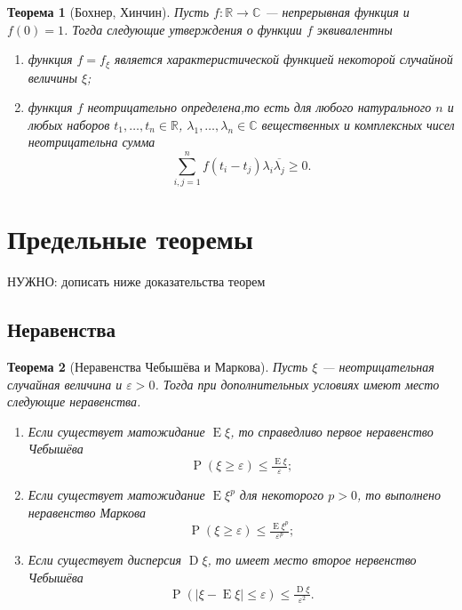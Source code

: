\documentclass[12pt]{article}
\newtheorem{theorem}{Теорема}
\numberwithin{theorem}{section}
\theoremstyle{definition}
\newcommand{\CC}{\mathbb{C}}
\newcommand{\RR}{\mathbb{R}}
\newcommand{\prob}{\operatorname{P}}
\newcommand{\expect}{\operatorname{E}}
\newcommand{\disp}{\operatorname{D}}
\newcommand{\TODO}[1]{\textcolor{todocolor}{НУЖНО: #1}}
\begin{document}
	\begin{theorem}[Бохнер, Хинчин]
		Пусть $ f \colon \RR \to \CC $ --- непрерывная функция и $ f(0) = 1 $.
		Тогда следующие утверждения о функции $ f $ эквивалентны
		\begin{enumerate}
			\item функция $ f = f_\xi $ является характеристической функцией некоторой случайной величины $ \xi $;
			\item функция $ f $ неотрицательно определена,то есть для любого натурального $ n $
			и любых наборов $ t_1, \ldots, t_n \in \RR $, $ \lambda_1, \ldots, \lambda_n \in \CC $
			вещественных и комплексных чисел неотрицательна
			сумма 
			$$ \sum\limits_{i,j = 1}^{n} f(t_i - t_j)\lambda_i\overline{\lambda_j} \geqslant 0. $$
		\end{enumerate}
	\end{theorem}
	
	\section{Предельные теоремы}
	
	\TODO{дописать ниже доказательства теорем}
	
	\subsection{Неравенства}
	
	\begin{theorem}[Неравенства Чебышёва и Маркова] \label{inequalities}
		Пусть $ \xi $ --- неотрицательная случайная величина и $ \varepsilon > 0 $.
		Тогда при дополнительных условиях имеют место следующие неравенства.
		\begin{enumerate}
			\item Если существует матожидание $ \expect\xi $, 
			то справедливо первое неравенство Чебышёва 
			$$ \prob(\xi \geqslant \varepsilon) \leqslant \tfrac{\expect\xi}{\varepsilon}; $$
			\label{inequalities | Chebyshev 1}
			\item Если существует матожидание $ \expect\xi^p $ для некоторого $ p > 0 $,
			то выполнено неравенство Маркова
			$$ \prob(\xi \geqslant \varepsilon) \leqslant \tfrac{\expect\xi^p}{\varepsilon^p}; $$
			\label{inequalities | Markov}
			\item Если существует дисперсия $ \disp\xi $, то имеет место второе нервенство Чебышёва
			$$ \prob(|\xi - \expect\xi| \leqslant \varepsilon) \leqslant \tfrac{\disp\xi}{\varepsilon^2}. $$
			\label{inequalities | Chebyshev 2}
		\end{enumerate}
	\end{theorem}
	
\end{document}
